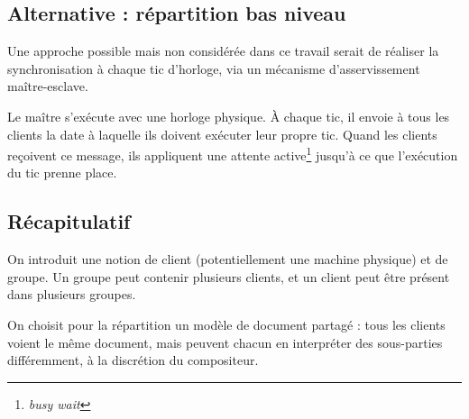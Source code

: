 \documentclass[10pt]{article}
\begin{document}




\subsection{Alternative : répartition bas niveau}
Une approche possible mais non considérée dans ce travail serait de réaliser la synchronisation à chaque tic d'horloge, via un mécanisme d'asservissement maître-esclave.

Le maître s'exécute avec une horloge physique.
À chaque tic, il envoie à tous les clients la date à laquelle ils doivent exécuter leur propre tic. 
Quand les clients reçoivent ce message, ils appliquent une attente active\footnote{\textit{busy wait}} jusqu'à ce que l'exécution du tic prenne place.
\subsection{Récapitulatif}
On introduit une notion de client (potentiellement une machine physique) et de groupe.
Un groupe peut contenir plusieurs clients, et un client peut être présent dans plusieurs groupes.

On choisit pour la répartition un modèle de document partagé : tous les clients voient le même document, mais peuvent chacun en interpréter des sous-parties différemment, à la discrétion du compositeur.
\end{document}
